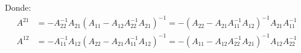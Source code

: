 \documentclass[12pt]{article}
\begin{document}
\begin{center}
\begin{tcolorbox}[colback=blue!10!white ,colframe=white,width=17 cm]
\large \sffamily Donde:
\begin{align*}
    A^{21} &= -A_{22}^{-1}A_{21} (A_{11} - A_{12}A_{22}^{-1}A_{21})^{-1} = - (A_{22} - A_{21} A_{11}^{-1} A_{12})^{-1} A_{21} A_{11}^{-1} \\
    A^{12} &= -A_{11}^{-1}A_{12}(A_{22} - A_{21}A_{11}^{-1}A_{12})^{-1} = -(A_{11} - A_{12}A_{22}^{-1}A_{21})^{-1} A_{12} A_{22}^{-1}
\end{align*}
\end{tcolorbox}
\end{center}
\end{document}
